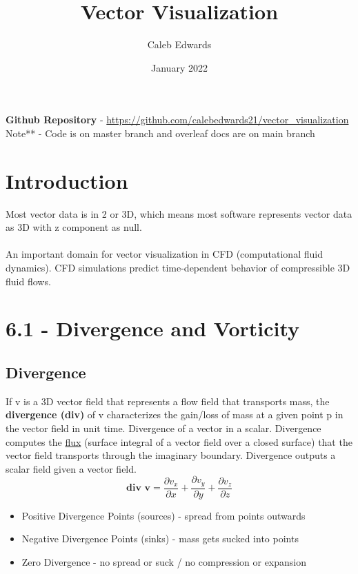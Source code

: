 \documentclass{article}
\title{Vector Visualization}
\author{Caleb Edwards}
\date{January 2022}
\begin{document}
\maketitle

\textbf{Github Repository} - \href{https://github.com/calebedwards21/vector_visualization}{https://github.com/calebedwards21/vector\_visualization}
\\
Note** - Code is on master branch and overleaf docs are on main branch

\section*{Introduction}
Most vector data is in 2 or 3D, which means most software represents vector data as 3D with z component as null.
\\\\
An important domain for vector visualization in CFD (computational fluid dynamics). CFD simulations predict time-dependent behavior of compressible 3D fluid flows.

\section*{6.1 - Divergence and Vorticity}
\subsection*{Divergence}
If v is a 3D vector field that represents a flow field that transports mass, the \textbf{divergence (div)} of v characterizes the gain/loss of mass at a given point p in the vector field in unit time. Divergence of a vector in a scalar. Divergence computes the \href{http://www-solar.mcs.st-and.ac.uk/~alan/MT3601/Fundamentals/node6.html}{flux} (surface integral of a vector field over a closed surface) that the vector field transports through the imaginary boundary. Divergence outputs a scalar field given a vector field. 
\begin{equation}
    \textbf{div v} = \frac{\partial v_x}{\partial x} + \frac{\partial v_y}{\partial y} + \frac{\partial v_z}{\partial z}
\end{equation}
\begin{itemize}
    \item Positive Divergence Points (sources) - spread from points outwards
    \item Negative Divergence Points (sinks) - mass gets sucked into points
    \item Zero Divergence - no spread or suck / no compression or expansion
\end{itemize}
\end{document}
